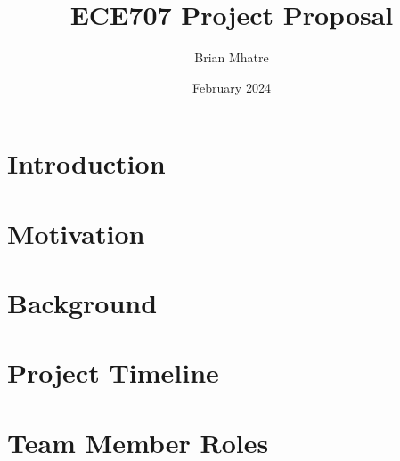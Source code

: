 \documentclass{article}
\title{ECE707 Project Proposal}
\author{Brian Mhatre}
\date{February 2024}
\begin{document}
\maketitle

\section{Introduction}
\section{Motivation}
\section{Background}
\section{Project Timeline}
\section{Team Member Roles}
\end{document}
